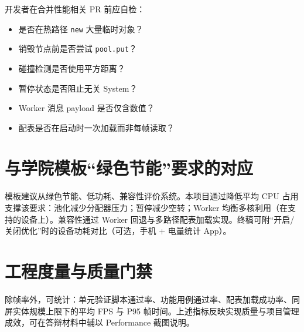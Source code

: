 开发者在合并性能相关 PR 前应自检：
\begin{itemize}
  \item 是否在热路径 \texttt{new} 大量临时对象？
  \item 销毁节点前是否尝试 \texttt{pool.put}？
  \item 碰撞检测是否使用平方距离？
  \item 暂停状态是否阻止无关 System？
  \item Worker 消息 payload 是否仅含数值？
  \item 配表是否在启动时一次加载而非每帧读取？
\end{itemize}

\section{与学院模板“绿色节能”要求的对应}

模板建议从绿色节能、低功耗、兼容性评价系统\cite{gregory2018game}。本项目通过降低平均 CPU 占用支撑该要求：池化减少分配器压力；暂停减少空转；Worker 均衡多核利用（在支持的设备上）。兼容性通过 Worker 回退与多路径配表加载实现。终稿可附“开启/关闭优化”时的设备功耗对比（可选，手机 + 电量统计 App）。

\section{工程度量与质量门禁}

除帧率外，可统计：单元验证脚本通过率、功能用例通过率、配表加载成功率、同屏实体规模上限下的平均 FPS 与 P95 帧时间。上述指标反映实现质量与项目管理成效\cite{munaiah2017github,petty2010vv}，可在答辩材料中辅以 Performance 截图说明。
